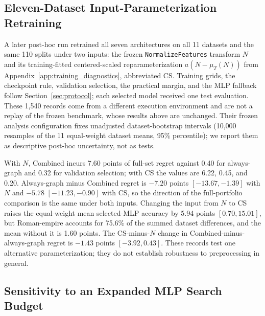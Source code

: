 \subsection{Eleven-Dataset Input-Parameterization Retraining}
\label{sec:input_robustness}

A later post-hoc run retrained all seven architectures on all 11 datasets and the same 110 splits under two inputs: the frozen \texttt{NormalizeFeatures} transform $N$ and its training-fitted centered-scaled reparameterization $a(N-\mu_T(N))$ from Appendix~\ref{app:training_diagnostics}, abbreviated CS. Training grids, the checkpoint rule, validation selection, the practical margin, and the MLP fallback follow Section~\ref{sec:protocol}; each selected model received one test evaluation. These 1,540 records come from a different execution environment and are not a replay of the frozen benchmark, whose results above are unchanged. Their frozen analysis configuration fixes unadjusted dataset-bootstrap intervals (10,000 resamples of the 11 equal-weight dataset means, 95\% percentile); we report them as descriptive post-hoc uncertainty, not as tests.

With $N$, Combined incurs 7.60 points of full-set regret against 0.40 for always-graph and 0.32 for validation selection; with CS the values are 6.22, 0.45, and 0.20. Always-graph minus Combined regret is $-7.20$ points $[-13.67,-1.39]$ with $N$ and $-5.78$ $[-11.23,-0.90]$ with CS, so the direction of the full-portfolio comparison is the same under both inputs. Changing the input from $N$ to CS raises the equal-weight mean selected-MLP accuracy by 5.94 points $[0.70,15.01]$, but Roman-empire accounts for 75.6\% of the summed dataset differences, and the mean without it is 1.60 points. The CS-minus-$N$ change in Combined-minus-always-graph regret is $-1.43$ points $[-3.92,0.43]$. These records test one alternative parameterization; they do not establish robustness to preprocessing in general.

\subsection{Sensitivity to an Expanded MLP Search Budget}
\label{sec:mlp_budget}

